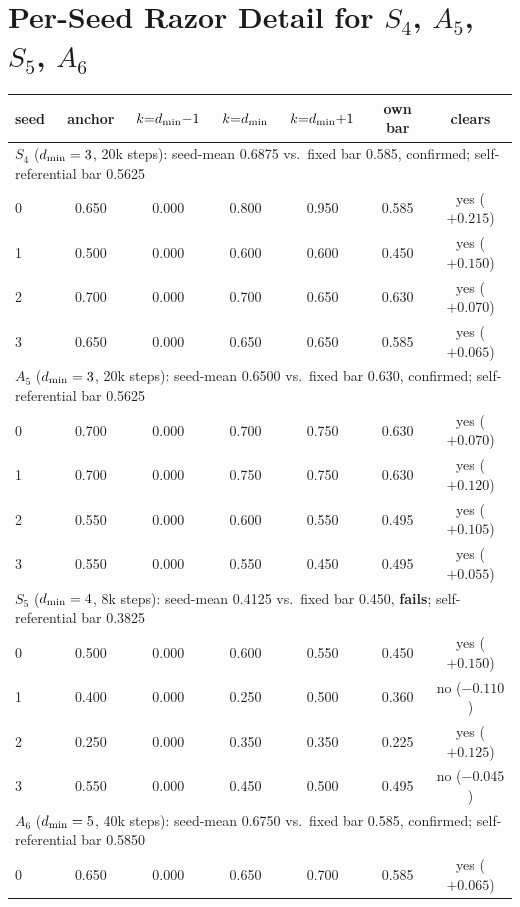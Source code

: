 \section{Per-Seed Razor Detail for $S_4$, $A_5$, $S_5$, $A_6$}
\label{app:ext4causal}

\begin{table}[H]
\centering
\small
\begin{tabular}{lcccccc}
\toprule
seed & anchor & $k{=}d_{\min}{-}1$ & $k{=}d_{\min}$ & $k{=}d_{\min}{+}1$ & own bar & clears \\
\midrule
\multicolumn{7}{l}{$S_4$ ($d_{\min} = 3$, 20k steps): seed-mean 0.6875 vs.\ fixed bar 0.585, confirmed; self-referential bar 0.5625} \\
0 & 0.650 & 0.000 & 0.800 & 0.950 & 0.585 & yes ($+0.215$) \\
1 & 0.500 & 0.000 & 0.600 & 0.600 & 0.450 & yes ($+0.150$) \\
2 & 0.700 & 0.000 & 0.700 & 0.650 & 0.630 & yes ($+0.070$) \\
3 & 0.650 & 0.000 & 0.650 & 0.650 & 0.585 & yes ($+0.065$) \\
\midrule
\multicolumn{7}{l}{$A_5$ ($d_{\min} = 3$, 20k steps): seed-mean 0.6500 vs.\ fixed bar 0.630, confirmed; self-referential bar 0.5625} \\
0 & 0.700 & 0.000 & 0.700 & 0.750 & 0.630 & yes ($+0.070$) \\
1 & 0.700 & 0.000 & 0.750 & 0.750 & 0.630 & yes ($+0.120$) \\
2 & 0.550 & 0.000 & 0.600 & 0.550 & 0.495 & yes ($+0.105$) \\
3 & 0.550 & 0.000 & 0.550 & 0.450 & 0.495 & yes ($+0.055$) \\
\midrule
\multicolumn{7}{l}{$S_5$ ($d_{\min} = 4$, 8k steps): seed-mean 0.4125 vs.\ fixed bar 0.450, \textbf{fails}; self-referential bar 0.3825} \\
0 & 0.500 & 0.000 & 0.600 & 0.550 & 0.450 & yes ($+0.150$) \\
1 & 0.400 & 0.000 & 0.250 & 0.500 & 0.360 & no ($-0.110$) \\
2 & 0.250 & 0.000 & 0.350 & 0.350 & 0.225 & yes ($+0.125$) \\
3 & 0.550 & 0.000 & 0.450 & 0.500 & 0.495 & no ($-0.045$) \\
\midrule
\multicolumn{7}{l}{$A_6$ ($d_{\min} = 5$, 40k steps): seed-mean 0.6750 vs.\ fixed bar 0.585, confirmed; self-referential bar 0.5850} \\
0 & 0.650 & 0.000 & 0.650 & 0.700 & 0.585 & yes ($+0.065$) \\

\end{tabular}
\end{table}
